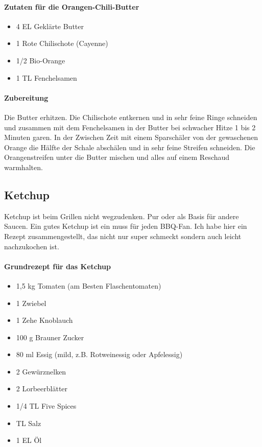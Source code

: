 \paragraph{Zutaten für die Orangen-Chili-Butter}\label{OrangenChili}

\begin{itemize}[noitemsep]
	\item 4 EL Geklärte Butter
	\item 1 Rote Chilischote (Cayenne)
	\item 1/2 Bio-Orange
	\item 1 TL Fenchelsamen
\end{itemize}

\paragraph{Zubereitung}

Die Butter erhitzen. Die Chilischote entkernen und in sehr feine Ringe schneiden und zusammen mit dem Fenchelsamen in der Butter bei 
schwacher Hitze 1 bis 2 Minuten garen. In der Zwischen Zeit mit einem Sparschäler von der gewaschenen Orange die Hälfte der Schale 
abschälen und in sehr feine Streifen schneiden. Die Orangenstreifen unter die Butter mischen und alles auf einem Reschaud warmhalten.

\subsection{Ketchup}
Ketchup ist beim Grillen nicht wegzudenken. Pur oder als Basis für andere 
Saucen. Ein gutes Ketchup ist ein muss für jeden BBQ-Fan.
Ich habe hier ein Rezept zusammengestellt, das nicht nur super schmeckt 
sondern auch leicht nachzukochen ist. 
\newline

\paragraph{Grundrezept für das Ketchup}

\begin{itemize}[noitemsep]
	\item 1,5 kg Tomaten (am Besten Flaschentomaten)
	\item 1 Zwiebel
	\item 1 Zehe Knoblauch
	\item 100 g Brauner Zucker
	\item 80 ml Essig (mild, z.B. Rotweinessig oder Apfelessig)
	\item 2 Gewürznelken
	\item 2 Lorbeerblätter
	\item 1/4 TL Five Spices
	\item TL Salz
	\item 1 EL Öl
\end{itemize}

